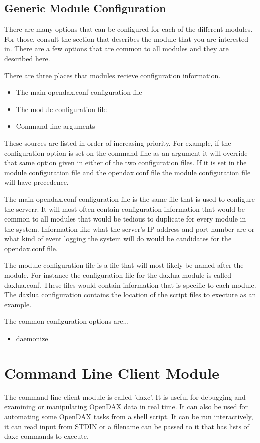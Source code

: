 \documentclass[10pt,letterpaper]{report}
\begin{document}
\section{Generic Module Configuration}
There are many options that can be configured for each of the different modules.  For those, consult the section that describes the module that you are interested in.  There are a few options that are common to all modules and they are described here.

There are three places that modules recieve configuration information.

\begin{itemize}
\item The main opendax.conf configuration file
\item The module configuration file
\item Command line arguments
\end{itemize}

These sources are listed in order of increasing priority.  For example, if the configuration option is set on the command line as an argument it will override that same option given in either of the two configuration files.  If it is set in the module configuration file and the opendax.conf file the module configuration file will have precedence.

The main opendax.conf configuration file is the same file that is used to configure the serverr.  It will most often contain configuration information that would be common to all modules that would be tedious to duplicate for every module in the system.  Information like what the server's IP address and port number are or what kind of event logging the system will do would be candidates for the opendax.conf file.

The module configuration file is a file that will most likely be named after the module.  For instance the configuration file for the daxlua module is called daxlua.conf.  These files would contain information that is specific to each module.  The daxlua configuration contains the location of the script files to execture as an example.

The common configuration options are...

\begin{itemize}
\item daemonize
\end{itemize}


\chapter{Command Line Client Module}
The command line client module is called 'daxc'.  It is useful for debugging and examining or manipulating OpenDAX data in real time.  It can also be used for automating some OpenDAX tasks from a shell script.  It can be run interactively, it can read input from STDIN or a filename can be passed to it that has lists of daxc commands to execute.
\end{document}
